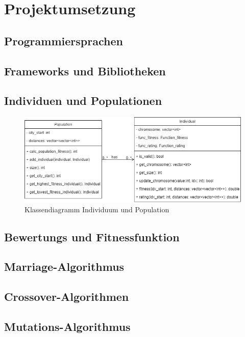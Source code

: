 
\section{Projektumsetzung}

\subsection{Programmiersprachen}

\subsection{Frameworks und Bibliotheken}

\subsection{Individuen und Populationen}

\begin{figure}[H]
\centering
\includegraphics[width=1\textwidth]{img/Vortrag/uml.png}
\caption{Klassendiagramm Individuum und Population}
\label{fig:klassendiagramm}
\end{figure}


\subsection{Bewertungs und Fitnessfunktion}

\subsection{Marriage-Algorithmus}

\subsection{Crossover-Algorithmen}

\subsection{Mutations-Algorithmus}

